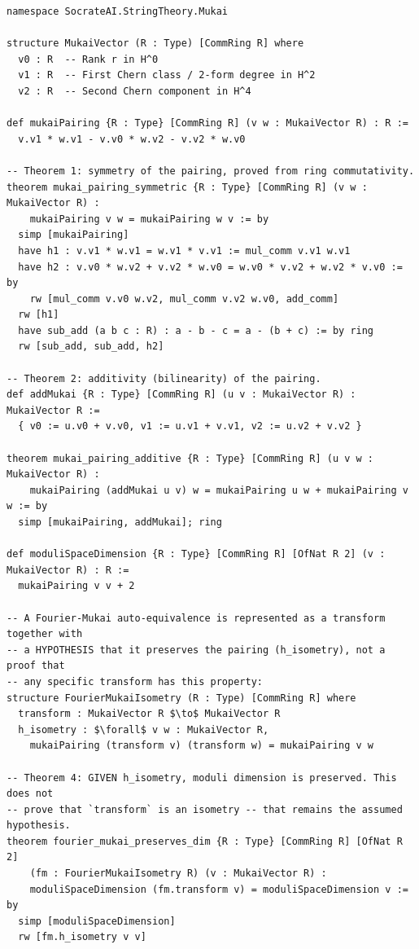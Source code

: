 \documentclass[11pt,a4paper]{article}
\begin{document}
\begin{lstlisting}[language=lean, caption={Lean 4: Mukai Pairing on $\Gamma^{4,20}$ and the Isometry-Hypothesis Structure, verbatim excerpt from \texttt{proofs/MukaiLatticeK3.lean}}]
namespace SocrateAI.StringTheory.Mukai

structure MukaiVector (R : Type) [CommRing R] where
  v0 : R  -- Rank r in H^0
  v1 : R  -- First Chern class / 2-form degree in H^2
  v2 : R  -- Second Chern component in H^4

def mukaiPairing {R : Type} [CommRing R] (v w : MukaiVector R) : R :=
  v.v1 * w.v1 - v.v0 * w.v2 - v.v2 * w.v0

-- Theorem 1: symmetry of the pairing, proved from ring commutativity.
theorem mukai_pairing_symmetric {R : Type} [CommRing R] (v w : MukaiVector R) :
    mukaiPairing v w = mukaiPairing w v := by
  simp [mukaiPairing]
  have h1 : v.v1 * w.v1 = w.v1 * v.v1 := mul_comm v.v1 w.v1
  have h2 : v.v0 * w.v2 + v.v2 * w.v0 = w.v0 * v.v2 + w.v2 * v.v0 := by
    rw [mul_comm v.v0 w.v2, mul_comm v.v2 w.v0, add_comm]
  rw [h1]
  have sub_add (a b c : R) : a - b - c = a - (b + c) := by ring
  rw [sub_add, sub_add, h2]

-- Theorem 2: additivity (bilinearity) of the pairing.
def addMukai {R : Type} [CommRing R] (u v : MukaiVector R) : MukaiVector R :=
  { v0 := u.v0 + v.v0, v1 := u.v1 + v.v1, v2 := u.v2 + v.v2 }

theorem mukai_pairing_additive {R : Type} [CommRing R] (u v w : MukaiVector R) :
    mukaiPairing (addMukai u v) w = mukaiPairing u w + mukaiPairing v w := by
  simp [mukaiPairing, addMukai]; ring

def moduliSpaceDimension {R : Type} [CommRing R] [OfNat R 2] (v : MukaiVector R) : R :=
  mukaiPairing v v + 2

-- A Fourier-Mukai auto-equivalence is represented as a transform together with
-- a HYPOTHESIS that it preserves the pairing (h_isometry), not a proof that
-- any specific transform has this property:
structure FourierMukaiIsometry (R : Type) [CommRing R] where
  transform : MukaiVector R $\to$ MukaiVector R
  h_isometry : $\forall$ v w : MukaiVector R,
    mukaiPairing (transform v) (transform w) = mukaiPairing v w

-- Theorem 4: GIVEN h_isometry, moduli dimension is preserved. This does not
-- prove that `transform` is an isometry -- that remains the assumed hypothesis.
theorem fourier_mukai_preserves_dim {R : Type} [CommRing R] [OfNat R 2]
    (fm : FourierMukaiIsometry R) (v : MukaiVector R) :
    moduliSpaceDimension (fm.transform v) = moduliSpaceDimension v := by
  simp [moduliSpaceDimension]
  rw [fm.h_isometry v v]
\end{lstlisting}
\end{document}
